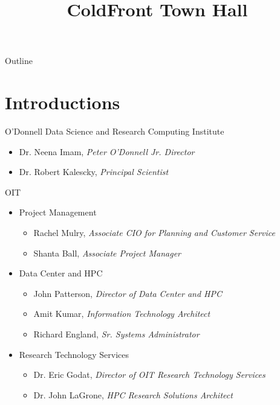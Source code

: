 \documentclass[aspectratio=169]{beamer}
\title{ColdFront Town Hall}
\institute{
O'Donnell Data Science and Research Computing Institute\\
SMU}
\date{}
\begin{document}
\begin{frame}
\titlepage
\end{frame}

\begin{frame}{Outline}
\footnotesize
\tableofcontents[hideallsubsections]
\end{frame}

\section{Introductions}

\begin{frame}{O'Donnell Data Science and Research Computing Institute}
\begin{itemize}
\item Dr. Neena Imam, \textit{Peter O'Donnell Jr. Director}
\item Dr. Robert Kalescky, \textit{Principal Scientist}
\end{itemize}
\end{frame}

\begin{frame}{OIT}
\begin{itemize}
\item Project Management
\begin{itemize}
\item Rachel Mulry, \textit{Associate CIO for Planning and Customer Service}
\item Shanta Ball, \textit{Associate Project Manager}
\end{itemize}
\item Data Center and HPC
\begin{itemize}
\item John Patterson, \textit{Director of Data Center and HPC}
\item Amit Kumar, \textit{Information Technology Architect}
\item Richard England, \textit{Sr. Systems Administrator}
\end{itemize}
\item Research Technology Services
\begin{itemize}
\item Dr. Eric Godat, \textit{Director of OIT Research Technology Services}
\item Dr. John LaGrone, \textit{HPC Research Solutions Architect}
\end{itemize}
\end{itemize}
\end{frame}
\end{document}
